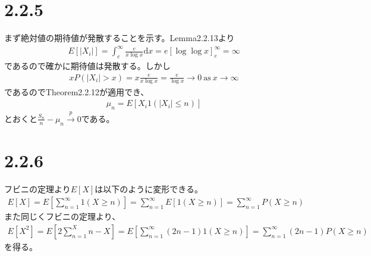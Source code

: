 \documentclass{article}
\begin{document}
\section{2.2.5}
まず絶対値の期待値が発散することを示す。Lemma2.2.13より
\begin{align*}
	E\left[ |X_i| \right] = \int_e^{\infty} \frac{e}{x\log x} \mathrm{d}x = e\left[ \log \log x \right]_e^{\infty} = \infty
\end{align*}
であるので確かに期待値は発散する。しかし
\begin{align*}
	x P\left( |X_i| > x \right) = x \frac{e}{x \log x} = \frac{e}{\log x} \to 0\ \text{as}\ x\to \infty
\end{align*}
であるのでTheorem2.2.12が適用でき、
\begin{align*}
	\mu_n = E\left[ X_i 1\left(|X_i| \leq n\right) \right]
\end{align*}
とおくと$\frac{S_n}{n} - \mu_n \xrightarrow{p} 0$である。


\section{2.2.6}
フビニの定理より$E[X]$は以下のように変形できる。
\begin{align*}
	E\left[ X \right] = E\left[ \sum_{n = 1}^{\infty} 1(X \geq n) \right] = \sum_{n = 1}^{\infty} E[1(X \geq n)] = \sum_{n = 1}^{\infty} P(X \geq n)
\end{align*}
また同じくフビニの定理より、
\begin{align*}
	E[X^2] = E\left[ 2 \sum_{n=1}^X n - X \right] = E\left[ \sum_{n=1}^{\infty} (2n-1) 1(X \geq n) \right] = \sum_{n=1}^{\infty} (2n-1) P(X \geq n)
\end{align*}
を得る。
\end{document}
